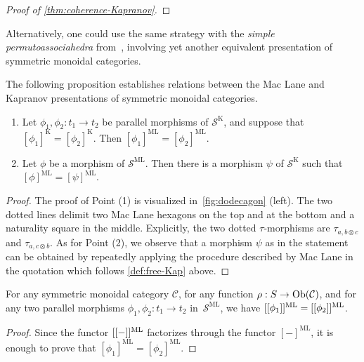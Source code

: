 {\begin{proof}[Proof of \cref{thm:coherence-Kapranov}]
\end{proof}
\begin{rem}
\label{rem:simple-permutoassociahedron}
 Alternatively, one could use the same strategy with the \emph{simple permutoassociahedra} from~\cite{baralicSimplePermutoassociahedron2019}, involving yet another equivalent presentation of symmetric monoidal categories. 
\end{rem}
The following proposition establishes relations between the Mac Lane and Kapranov presentations of symmetric monoidal categories.
\begin{proposition}
\label{Kapranov-MacLane}
\leavevmode
\begin{enumerate}
\item Let $\phi_1,\phi_2: t_1 \to t_2$  be parallel morphisms of $\mathcal{S}^{\mathrm{K}}$, and suppose that $[\phi_1]^{\mathrm{K}}=[\phi_2]^{\mathrm{K}}$. Then $[\phi_1]^{\mathrm{ML}}=[\phi_2]^{\mathrm{ML}}$.
\item Let $\phi$ be a morphism of $\mathcal{S}^{\mathrm{ML}}$. Then there is a morphism $\psi$ of 
$\mathcal{S}^{\mathrm{K}}$ such that $[\phi]^{\mathrm{ML}}=[\psi]^{\mathrm{ML}}$.
\end{enumerate}
\end{proposition}
\begin{proof}
The proof of Point (1) is visualized in~\cref{fig:dodecagon} (left).  
The two dotted lines delimit two Mac Lane hexagons on the top and at the bottom and a naturality square in the middle.
Explicitly, the two dotted $\tau$-morphisms are $\tau_{a,b\otimes c}$ and $\tau_{a,c\otimes b}$.  
As for Point (2), we observe that a morphism $\psi$ as in the statement can be obtained by repeatedly applying the procedure described by Mac Lane in the quotation which follows \cref{def:free-Kap} above.
\end{proof}
\begin{thm}
\label{thm:coherence-MacLane}
    For any symmetric monoidal category $\mathcal{C}$, for any  function $\rho : S \to \mathrm{Ob}(\mathcal{C})$, and for any two parallel morphisms $\phi_1,\phi_2: t_1 \to t_2$ in~$\mathcal{S}^{\mathrm{ML}}$, we have $[[\phi_1]]^{\mathrm{ML}}=[[\phi_2]]^{\mathrm{ML}}$.
\end{thm}
\begin{proof} 
Since the functor $[[-]]^{\mathrm{ML}}$ factorizes through the functor $[-]^{\mathrm{ML}}$, it is enough to prove that $[\phi_1]^{\mathrm{ML}}=
[\phi_2]^{\mathrm{ML}}$. 

\end{proof}}
